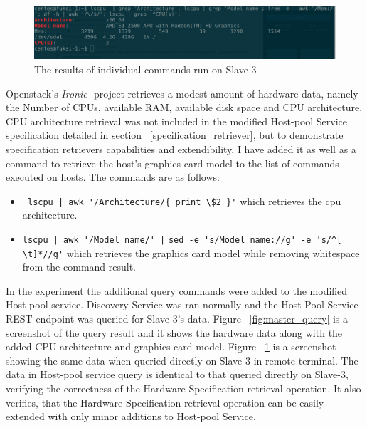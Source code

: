 \begin{figure}[ht!]
\centering
  \includegraphics[width=\textwidth, keepaspectratio]{slave_3_specs_screenshot.png}%
  \caption{The results of individual commands run on Slave-3}
  \label{fig:slave_3_specs}
\end{figure}

Openstack's \textit{Ironic} -project\cite{ironic_troubleshoot} retrieves a modest amount of hardware data, namely the Number of CPUs, available RAM, available disk space and CPU architecture. CPU architecture retrieval was not included in the modified Host-pool Service specification detailed in section ~\ref{specification_retriever}, but to demonstrate specification retrievers capabilities and extendibility, I have added it as well as a command to retrieve the host's graphics card model to the list of commands executed on hosts. The commands are as follows:

\begin{itemize}
\item \verb= lscpu | awk '/Architecture/{ print \$2 }'= which retrieves the cpu architecture.
\item \verb=lscpu | awk '/Model name/' |= \linebreak \verb=sed -e 's/Model name://g' -e 's/^[ \t]*//g'= which retrieves the graphics card model while removing whitespace from the command result.
\end{itemize}

In the experiment the additional query commands were added to the modified Host-pool service. Discovery Service was ran normally and the Host-Pool Service REST endpoint was queried for Slave-3's data. Figure ~\ref{fig:master_query} is a screenshot of the query result and it shows the hardware data along with the added CPU architecture and graphics card model. Figure ~\ref{fig:slave_3_specs} is a screenshot showing the same data when queried directly on Slave-3 in remote terminal. The data in Host-pool service query is identical to that queried directly on Slave-3, verifying the correctness of the Hardware Specification retrieval operation. It also verifies, that the Hardware Specification retrieval operation can be easily extended with only minor additions to Host-pool Service.


